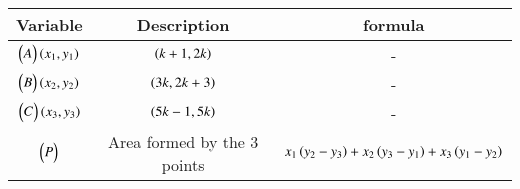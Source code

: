 \begin{tabular}[12pt]{ |c|c|c|}
\hline
\textbf{Variable} & \textbf{Description} & \textbf{formula}\\ 
\hline
$\begin{pmatrix}A\end{pmatrix}\left(x_1,y_1\right)$ & $\left(k+1,2k\right)$  & - \\
\hline 
$\begin{pmatrix}B\end{pmatrix}\left(x_2,y_2\right)$ & $\left(3k,2k+3\right)$ & - \\
\hline
$\begin{pmatrix}C\end{pmatrix}\left(x_3,y_3\right)$ & $\left(5k-1,5k\right)$ & - \\
\hline 
$\begin{pmatrix}P\end{pmatrix}$ & Area formed by the 3 points & $x_1\left(y_2-y_3\right)+x_2\left(y_3-y_1\right)+x_3\left(y_1-y_2\right)$\\
\hline
\end{tabular}

